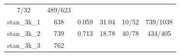 \documentclass[]{article}
\begin{document}
\begin{longtable}[]{@{}cccccc@{}}
\begin{minipage}[t]{0.18\columnwidth}
7/32\strut
\end{minipage} & \begin{minipage}[t]{0.22\columnwidth}\centering\strut
489/623\strut
\end{minipage}\tabularnewline
\begin{minipage}[t]{0.11\columnwidth}\centering\strut
stan\_3k\_1\strut
\end{minipage} & \begin{minipage}[t]{0.07\columnwidth}\centering\strut
638\strut
\end{minipage} & \begin{minipage}[t]{0.11\columnwidth}\centering\strut
0.059\strut
\end{minipage} & \begin{minipage}[t]{0.13\columnwidth}\centering\strut
31.04\strut
\end{minipage} & \begin{minipage}[t]{0.18\columnwidth}\centering\strut
10/52\strut
\end{minipage} & \begin{minipage}[t]{0.22\columnwidth}\centering\strut
739/1038\strut
\end{minipage}\tabularnewline
\begin{minipage}[t]{0.11\columnwidth}\centering\strut
stan\_3k\_2\strut
\end{minipage} & \begin{minipage}[t]{0.07\columnwidth}\centering\strut
739\strut
\end{minipage} & \begin{minipage}[t]{0.11\columnwidth}\centering\strut
0.713\strut
\end{minipage} & \begin{minipage}[t]{0.13\columnwidth}\centering\strut
18.78\strut
\end{minipage} & \begin{minipage}[t]{0.18\columnwidth}\centering\strut
40/78\strut
\end{minipage} & \begin{minipage}[t]{0.22\columnwidth}\centering\strut
434/405\strut
\end{minipage}\tabularnewline
\begin{minipage}[t]{0.11\columnwidth}\centering\strut
stan\_3k\_3\strut
\end{minipage} & \begin{minipage}[t]{0.07\columnwidth}\centering\strut
762\strut
\end{minipage} & \begin{minipage}[t]{0.11\columnwidth}\centering\strut

\end{minipage}
\end{longtable}
\end{document}
